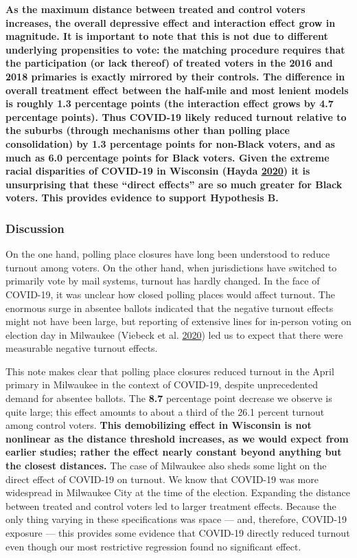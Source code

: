 \documentclass[
  12pt,
]{article}
\begin{document}
\textbf{As the maximum distance between treated and control voters increases, the overall depressive effect and interaction effect grow in magnitude. It is important to note that this is not due to different underlying propensities to vote: the matching procedure requires that the participation (or lack thereof) of treated voters in the 2016 and 2018 primaries is exactly mirrored by their controls. The difference in overall treatment effect between the half-mile and most lenient models is roughly 1.3 percentage points (the interaction effect grows by 4.7 percentage points). Thus COVID-19 likely reduced turnout relative to the suburbs (through mechanisms other than polling place consolidation) by 1.3 percentage points for non-Black voters, and as much as 6.0 percentage points for Black voters. Given the extreme racial disparities of COVID-19 in Wisconsin (Hayda \protect\hyperlink{ref-Hayda2020}{2020}) it is unsurprising that these ``direct effects'' are so much greater for Black voters. This provides evidence to support Hypothesis B.}

\hypertarget{discussion}{%
\subsubsection*{Discussion}\label{discussion}}

On the one hand, polling place closures have long been understood to reduce turnout among voters. On the other hand, when jurisdictions have switched to primarily vote by mail systems, turnout has hardly changed. In the face of COVID-19, it was unclear how closed polling places would affect turnout. The enormous surge in absentee ballots indicated that the negative turnout effects might not have been large, but reporting of extensive lines for in-person voting on election day in Milwaukee (Viebeck et al. \protect\hyperlink{ref-Viebeck2020}{2020}) led us to expect that there were measurable negative turnout effects.

This note makes clear that polling place closures reduced turnout in the April primary in Milwaukee in the context of COVID-19, despite unprecedented demand for absentee ballots. The \textbf{8.7} percentage point decrease we observe is quite large; this effect amounts to about a third of the 26.1 percent turnout among control voters. \textbf{This demobilizing effect in Wisconsin is not nonlinear as the distance threshold increases, as we would expect from earlier studies; rather the effect nearly constant beyond anything but the closest distances.} The case of Milwaukee also sheds some light on the direct effect of COVID-19 on turnout. We know that COVID-19 was more widespread in Milwaukee City at the time of the election. Expanding the distance between treated and control voters led to larger treatment effects. Because the only thing varying in these specifications was space --- and, therefore, COVID-19 exposure --- this provides some evidence that COVID-19 directly reduced turnout even though our most restrictive regression found no significant effect.
\end{document}
